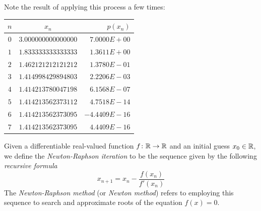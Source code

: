Note the result of applying this process a few times:
\begin{center}\label{table:Newton-Raphson}
\begin{tabular}{|c|c|r|} \hline 
$n$ & $x_n$ & $p(x_n)$ \\ \hline \hline 
$0$ & $3.000000000000000$ & $7.0000E+00$ \\ \hline 
$1$ & $1.833333333333333$ & $1.3611E+00$ \\ \hline 
$2$ & $1.462121212121212$ & $1.3780E-01$ \\ \hline 
$3$ & $1.414998429894803$ & $2.2206E-03$ \\ \hline 
$4$ & $1.414213780047198$ & $6.1568E-07$ \\ \hline 
$5$ & $1.414213562373112$ & $4.7518E-14$ \\ \hline 
$6$ & $1.414213562373095$ & $-4.4409E-16$ \\ \hline 
$7$ & $1.414213562373095$ & $4.4409E-16$ \\ \hline 
\end{tabular}
\end{center}

\begin{definition}
Given a differentiable real-valued function $f\colon \mathbb{R} \to \mathbb{R}$ and an initial guess $x_0 \in \mathbb{R}$, we define the \emph{Newton-Raphson iteration} to be the sequence given by the following \emph{recursive formula}
\begin{equation*}
x_{n+1} = x_n - \frac{f(x_n)}{f'(x_n)}
\end{equation*}
The \emph{Newton-Raphson method} (or \emph{Newton method}) refers to employing this sequence to search and approximate roots of the equation $f(x) = 0$.
\end{definition}

